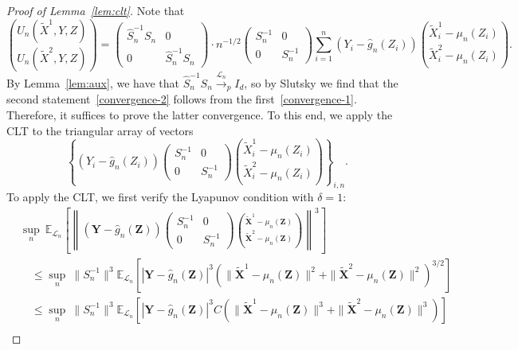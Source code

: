 \documentclass[12pt]{article}
\theoremstyle{definition}
\theoremstyle{remark}
\newcommand{\prz}{\bm Z}
\newcommand{\srz}{Z}
\newcommand{\prxk}{{{\widetilde{\bm X}}}}
\newcommand{\srxk}{\widetilde X}
\newcommand{\pry}{{\bm Y}}
\newcommand{\sry}{Y}
\begin{document}
\begin{proof}[Proof of Lemma~\ref{lem:clt}]
	
	Note that
	\begin{equation*}
		{U_n(\srxk^1, \sry, \srz) \choose U_n(\srxk^2, \sry, \srz)} = \begin{pmatrix}
			\widehat S_n^{-1}S_n & 0 \\
			0 & \widehat S_n^{-1}S_n
		\end{pmatrix} \cdot n^{-1/2}
		\begin{pmatrix}
			S_n^{-1} & 0 \\
			0 & S_n^{-1}
		\end{pmatrix}\sum_{i = 1}^n(\sry_{i} - \widehat g_n(\srz_{i})) {\srxk^1_{i} - \mu_n(\srz_i) \choose \srxk^2_{i} - \mu_n(\srz_i)}.
	\end{equation*}
	By Lemma~\ref{lem:aux}, we have that $\widehat S_n^{-1}S_n \overset{\mathcal L_n}\rightarrow_p I_d$, so by Slutsky we find that the second statement~\eqref{convergence-2} follows from the first~\eqref{convergence-1}. Therefore, it suffices to prove the latter convergence. To this end, we apply the CLT to the triangular array of vectors
	\begin{equation}
		\left\{ (\sry_{i} - \widehat g_n(\srz_{i}))\begin{pmatrix}
			S_n^{-1} & 0 \\
			0 & S_n^{-1}
		\end{pmatrix}{\srxk^1_{i} - \mu_n(\srz_i) \choose \srxk^2_{i} - \mu_n(\srz_i)}\right\}_{i,n}. 
	\end{equation}
	To apply the CLT, we first verify the Lyapunov condition with $\delta = 1$: 
	\begin{equation}
		\begin{split}
			&\sup_{n}\ \mathbb E_{\mathcal L_n}\left[\left\|(\pry- \widehat g_n(\prz))
			\begin{pmatrix}
				S_n^{-1} & 0 \\
				0 & S_n^{-1}
			\end{pmatrix}{\prxk^1 - \mu_n(\prz) \choose \prxk^2 - \mu_n(\prz)}\right\|^3\right] \\
			&\quad \leq \sup_{n}\ \|S_n^{-1}\|^3 \mathbb E_{\mathcal L_n}\left[|\pry- \widehat g_n(\prz)|^3(\|\prxk^1 - \mu_n(\prz)\|^2 + \|\prxk^2 - \mu_n(\prz)\|^2)^{3/2}\right] \\
			&\quad \leq \sup_{n}\ \|S_n^{-1}\|^3 \mathbb E_{\mathcal L_n}\left[|\pry- \widehat g_n(\prz)|^3C\left(\|\prxk^1 - \mu_n(\prz)\|^3 + \|\prxk^2 - \mu_n(\prz)\|^3\right)\right] \\

\end{split}
\end{equation}
\end{proof}
\end{document}
